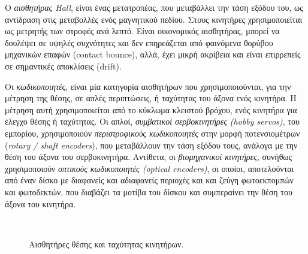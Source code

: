 \begin{enumerate}
Ο \textit{αισθητήρας Hall}, είναι ένας μετατροπέας, που μεταβάλλει την τάση εξόδου του, ως αντίδραση στις μεταβολλές ενός μαγνητικού πεδίου. Στους κινητήρες χρησιμοποιείται ως μετρητής των στροφές ανά λεπτό. Είναι οικονομικός αισθητήρας, μπορεί να δουλέψει σε υψηλές συχνότητες και δεν επηρεάζεται από φαινόμενα θορύβου μηχανικών επαφών (contact bounce), αλλά, έχει μικρή ακρίβεια και είναι επιρρεπείς σε σημαντικές αποκλίσεις (drift).

Οι \textit{κωδικοποιητές}, είναι μία κατηγορία αισθητήρων που χρησιμοποιούνται, για την μέτρηση της θέσης, σε απλές περιπτώσεις, ή ταχύτητας του άξονα ενός κινητήρα. Η μέτρηση αυτή χρησιμοποιείται από το κύκλωμα κλειστού βρόχου, ενός κινητήρα για έλεγχο θέσης ή ταχύτητας. Οι απλοί, \textit{συμβατικοί σερβοκινητήρες (hobby servos)}, του εμπορίου, χρησιμοποιούν \textit{περιστροφικούς κωδικοποιητές} στην μορφή ποτενσιομέτρων (\textit{rotary / shaft encoders}), που μεταβάλλουν την τάση εξόδου τους, ανάλογα με την θέση του άξονα του σερβοκινητήρα. Αντίθετα, οι \textit{βιομηχανικοί κινητήρες}, συνήθως χρησιμοποιούν \textit{οπτικούς κωδικοποιητές (optical encoders)}, οι οποίοι, αποτελούνται από έναν δίσκο με διαφανείς και αδιαφανείς περιοχές και και ζεύγη φωτοεκπομπών και φωτοδεκτών, που διαβάζει τα μοτίβα του δίσκου και συμπεραίνει την θέση του άξονα του κινητήρα.

\bigskip
\begin{figure}[!ht]
	\centering
	\\
	\caption{Αισθητήρες θέσης και ταχύτητας κινητήρων.}
\end{figure}



\end{enumerate}
